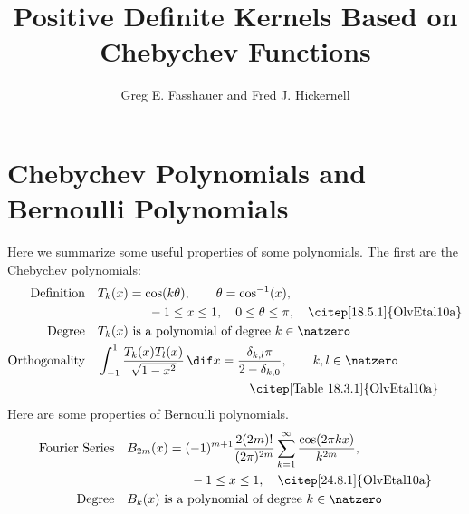 \documentclass[]{elsarticle}
\theoremstyle{definition}
\begin{document}
\begin{frontmatter}

\title{Positive Definite Kernels Based on Chebychev Functions}
\author{Greg E. Fasshauer and Fred J. Hickernell}
\address{Room E1-208, Department of Applied Mathematics, Illinois Institute of Technology,\\ 10 W.\ 32$^{\text{nd}}$ St., Chicago, IL 60616}
\begin{abstract}
\end{abstract}

\begin{keyword}


\end{keyword}
\end{frontmatter}

\section{Chebychev Polynomials and Bernoulli Polynomials}
Here we summarize some useful properties of some polynomials.  The first are the Chebychev polynomials:
\begin{align}
\text{Definition} \quad & T_k(x) = \cos(k \theta), \qquad \theta=\cos^{-1}(x),\nonumber \\
& \qquad \qquad -1 \le x \le 1, \quad 0 \le \theta \le \pi, \quad \text{\citep[18.5.1]{OlvEtal10a}} \\
\text{Degree} \quad &T_k(x) \text{ is a polynomial of degree } k \in \natzero  \nonumber \\
\text{Orthogonality} \quad & \int_{-1}^{1} \frac{T_k(x)T_{l}(x)}{\sqrt{1-x^2}} \, \dif x = \frac{\delta_{k,l}\pi}{2-\delta_{k,0}} ,  \qquad k,l \in \natzero \nonumber \\
& \qquad \qquad \qquad \qquad \qquad \qquad  \text{\citep[Table 18.3.1]{OlvEtal10a}}
\end{align}
Here are some properties of Bernoulli polynomials.
\begin{align}
\text{Fourier Series} \quad & B_{2m}(x) = (-1)^{m+1} \frac{2 (2m)!} {(2 \pi)^{2m}} \sum_{k=1}^{\infty} \frac{\cos(2 \pi k x)}{k^{2m}}, \nonumber \\
& \qquad \qquad  \quad -1 \le x \le 1, \quad \text{\citep[24.8.1]{OlvEtal10a}} \\
\text{Degree} \quad &B_k(x) \text{ is a polynomial of degree } k \in \natzero  \nonumber \end{align}
\end{document}
